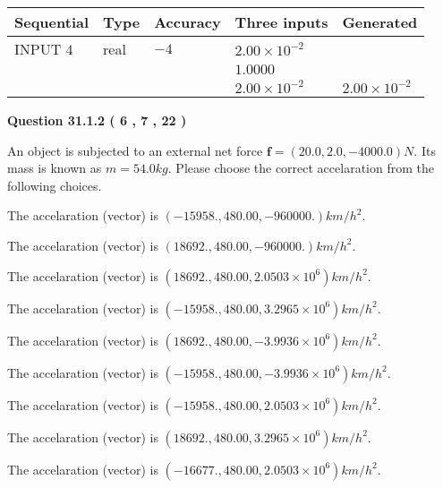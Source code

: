 \documentclass[12pt]{article}
\begin{document}
   
  
  
\noindent\begin{tabular}{|l|l|l|l|l|}
\hline
 Sequential & Type & Accuracy & Three inputs & Generated \\ 
\hline
 
 
  INPUT $            4 $ & real & $           -4  $ & $
 2.00 \times 10^{-2}
  $ & \\
  & & &  $
 1.0000
  $ & \\
  & & &  $
 2.00 \times 10^{-2}
 $ & $ 2.00 \times 10^{-2} $ 
 \\  \hline  
 \end{tabular}
   
   
  
\vspace{0.2in}
  
{\textbf{\Large{Question
31.1.2 
 (           6 ,           7 ,          22 )
}}}
  
  
 
An object is subjected to an external net force $\mathbf{f}=(
20.0 ,
2.0,
-4000.0  )N$. Its mass is known as
$m= %
54.0  kg$. Please choose the correct accelaration
from the following choices.
 
 
 
The accelaration (vector) is
$(
-15958.,
480.00 ,
-960000.
)km/h^2.
$
 
 
The accelaration (vector) is
$(
18692.,
480.00 ,
-960000.
)km/h^2.
$
 
 
The accelaration (vector) is
$(
18692.,
480.00 ,
2.0503 \times 10^{6}
)km/h^2.
$
 
 
The accelaration (vector) is
$(
-15958.,
480.00 ,
3.2965 \times 10^{6}
)km/h^2.
$
 
 
The accelaration (vector) is
$(
18692.,
480.00 ,
-3.9936 \times 10^{6}
)km/h^2.
$
 
 
The accelaration (vector) is
$(
-15958.,
480.00 ,
-3.9936 \times 10^{6}
)km/h^2.
$
 
 
The accelaration (vector) is
$(
-15958.,
480.00 ,
2.0503 \times 10^{6}
)km/h^2.
$
 
 
The accelaration (vector) is
$(
18692.,
480.00 ,
3.2965 \times 10^{6}
)km/h^2.
$
 
 
The accelaration (vector) is
$(
-16677.,
480.00 ,
2.0503 \times 10^{6}
)km/h^2.
$
 
\end{document}
